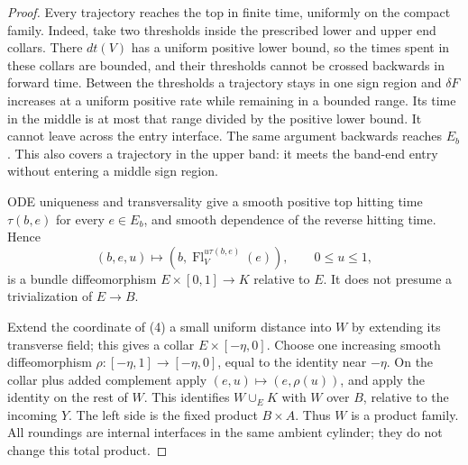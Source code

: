 \documentclass[11pt]{article}
\begin{document}
\begin{proof}
Every trajectory reaches the top in finite time, uniformly on the
compact family. Indeed, take two thresholds inside the prescribed
lower and upper end collars. There $dt(V)$ has a uniform positive
lower bound, so the times spent in these collars are bounded, and
their thresholds cannot be crossed backwards in forward time.
Between the thresholds a trajectory stays in one sign region and
$\delta F$ increases at a uniform positive rate while remaining in
a bounded range. Its time in the middle is at most that range divided
by the positive lower bound. It cannot leave across the entry interface.
The same argument backwards reaches $E_b$. This also covers a trajectory
in the upper band: it meets the band-end entry without entering a
middle sign region.

ODE uniqueness and transversality give a smooth positive top hitting
time $\tau(b,e)$ for every $e\in E_b$, and smooth dependence of the
reverse hitting time. Hence
\[
 (b,e,u)\longmapsto
       (b,\operatorname{Fl}^{u\tau(b,e)}_V(e)),
 \qquad 0\leq u\leq1,
                                                               \tag{4}
\]
is a bundle diffeomorphism $E\times[0,1]\to K$ relative to $E$.
It does not presume a trivialization of $E\to B$.

Extend the coordinate of (4) a small uniform distance into $W$ by
extending its transverse field; this gives a collar $E\times[-\eta,0]$.
Choose one increasing smooth diffeomorphism
$\rho:[-\eta,1]\to[-\eta,0]$, equal to the identity near $-\eta$.
On the collar plus added complement apply $(e,u)\mapsto(e,\rho(u))$,
and apply the identity on the rest of $W$.
This identifies $W\cup_E K$ with $W$ over $B$, relative to the incoming
$Y$. The left side is the fixed product $B\times A$.
Thus $W$ is a product family. All roundings are internal interfaces
in the same ambient cylinder; they do not change this total product.
\end{proof}
\end{document}
